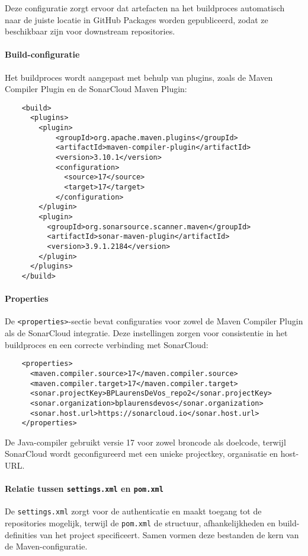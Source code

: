 Deze configuratie zorgt ervoor dat artefacten na het buildproces automatisch naar de juiste locatie in GitHub Packages worden gepubliceerd, zodat ze beschikbaar zijn voor downstream repositories.

\paragraph{Build-configuratie}
Het buildproces wordt aangepast met behulp van plugins, zoals de Maven Compiler Plugin en de SonarCloud Maven Plugin:

\begin{verbatim}
    <build>
      <plugins>
        <plugin>
            <groupId>org.apache.maven.plugins</groupId>
            <artifactId>maven-compiler-plugin</artifactId>
            <version>3.10.1</version>
            <configuration>
              <source>17</source>
              <target>17</target>
            </configuration>
        </plugin>
        <plugin>
          <groupId>org.sonarsource.scanner.maven</groupId>
          <artifactId>sonar-maven-plugin</artifactId>
          <version>3.9.1.2184</version>
        </plugin>
      </plugins>
    </build>
\end{verbatim}

\paragraph{Properties}
De \texttt{<properties>}-sectie bevat configuraties voor zowel de Maven Compiler Plugin als de SonarCloud integratie. Deze instellingen zorgen voor consistentie in het buildproces en een correcte verbinding met SonarCloud:

\begin{verbatim}
    <properties>
      <maven.compiler.source>17</maven.compiler.source>
      <maven.compiler.target>17</maven.compiler.target>
      <sonar.projectKey>BPLaurensDeVos_repo2</sonar.projectKey>
      <sonar.organization>bplaurensdevos</sonar.organization>
      <sonar.host.url>https://sonarcloud.io</sonar.host.url>
    </properties>
\end{verbatim}

De Java-compiler gebruikt versie 17 voor zowel broncode als doelcode, terwijl SonarCloud wordt geconfigureerd met een unieke projectkey, organisatie en host-URL.

\paragraph{Relatie tussen \texttt{settings.xml} en \texttt{pom.xml}}
De \texttt{settings.xml} zorgt voor de authenticatie en maakt toegang tot de repositories mogelijk, terwijl de \texttt{pom.xml} de structuur, afhankelijkheden en build-definities van het project specificeert. Samen vormen deze bestanden de kern van de Maven-configuratie.


